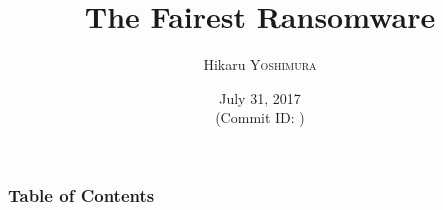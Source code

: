 \hypersetup{colorlinks,linkcolor=,urlcolor=links}

\beamertemplatenavigationsymbolsempty


\usepackage{pgfpages}
\usepackage{epigraph}
\usepackage{etoolbox}
\usepackage{tikz}
\usepackage{framed}
\usepackage[ss]{libertine}
\usepackage{amsmath}
\usepackage{mathtools}
\usepackage{listings}


\setmonofont[Ligatures=TeX]{CMU Typewriter Text}



\title{The Fairest Ransomware}
\author[Hikaru YOSHIMURA]{%
  Hikaru \textsc{Yoshimura}
}
\date[July 31, 2017]{%
  July 31, 2017 \\%
  {\footnotesize (Commit ID: \GITAbrHash)}
}






\newcommand\ballref[1]{%
\tikz \node[circle, shade,ball color=structure.fg,inner sep=0pt,%
  text width=8pt,font=\tiny,align=center] {\color{white}\ref{#1}};
}



\frame{\maketitle}

\begin{frame}
  \frametitle{Table of Contents}

  \tableofcontents
\end{frame}

